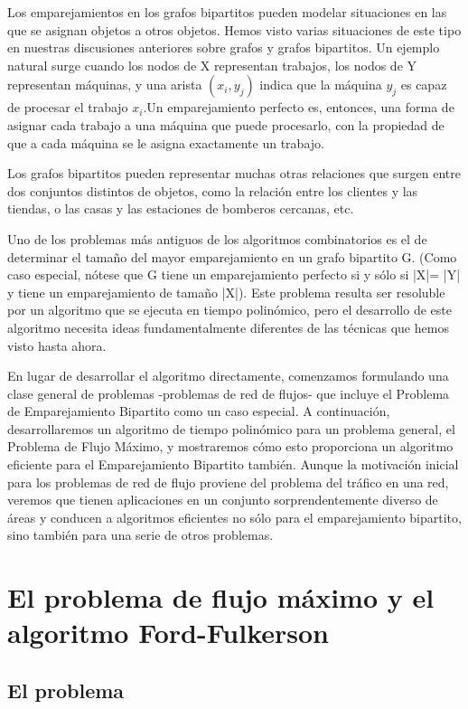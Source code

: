 \documentclass[a4paper, 12pt]{book}
\begin{document}
Los emparejamientos en los grafos bipartitos pueden modelar situaciones en las que se asignan objetos a otros objetos. Hemos visto varias situaciones de este tipo en nuestras discusiones anteriores sobre grafos y grafos bipartitos. Un ejemplo natural surge cuando los nodos de X representan trabajos, los nodos de Y representan máquinas, y una arista $(x_i, y_j)$ indica que la máquina $y_j$ es capaz de procesar el trabajo $x_i$.Un emparejamiento perfecto es, entonces, una forma de asignar cada trabajo a una máquina que puede procesarlo, con la propiedad de que a cada máquina se le asigna exactamente un trabajo. 

Los grafos bipartitos pueden representar muchas otras relaciones que surgen entre dos conjuntos distintos de objetos, como la relación entre los clientes y las tiendas, o las casas y las estaciones de bomberos cercanas, etc.

Uno de los problemas más antiguos de los algoritmos combinatorios es el de determinar el tamaño del mayor emparejamiento en un grafo bipartito G. (Como caso especial, nótese que G tiene un emparejamiento perfecto si y sólo si |X|= |Y| y tiene un emparejamiento de tamaño |X|). Este problema resulta ser resoluble por un algoritmo que se ejecuta en tiempo polinómico, pero el desarrollo de este algoritmo necesita ideas fundamentalmente diferentes de las técnicas que hemos visto hasta ahora.

En lugar de desarrollar el algoritmo directamente, comenzamos formulando una clase general de problemas -problemas de red de flujos- que incluye el Problema de Emparejamiento Bipartito como un caso especial. 
A continuación, desarrollaremos un algoritmo de tiempo polinómico para un problema general, el Problema de Flujo Máximo, y mostraremos cómo esto proporciona un algoritmo eficiente para el Emparejamiento Bipartito también.
Aunque la motivación inicial para los problemas de red de flujo proviene del problema del tráfico en una red, veremos que tienen aplicaciones en un conjunto sorprendentemente diverso de áreas y conducen a algoritmos eficientes no sólo para el emparejamiento bipartito, sino también para una serie de otros problemas.


\section{El problema de flujo máximo y el algoritmo Ford-Fulkerson}

\subsection*{El problema} 
\end{document}
